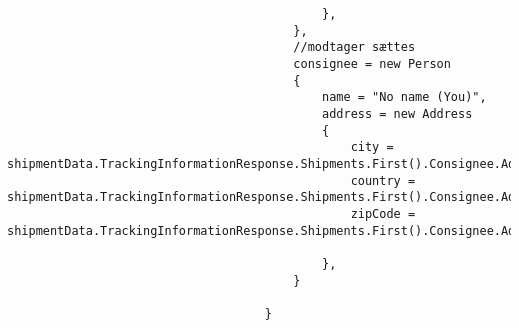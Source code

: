 \begin{verbatim}
                                            },
                                        },
                                        //modtager sættes
                                        consignee = new Person
                                        {
                                            name = "No name (You)",
                                            address = new Address
                                            {
                                                city = shipmentData.TrackingInformationResponse.Shipments.First().Consignee.Address.City,
                                                country = shipmentData.TrackingInformationResponse.Shipments.First().Consignee.Address.Country,
                                                zipCode = shipmentData.TrackingInformationResponse.Shipments.First().Consignee.Address.PostCode.ToString(),
        
                                            },
                                        }
        
                                    }
        

\end{verbatim}

